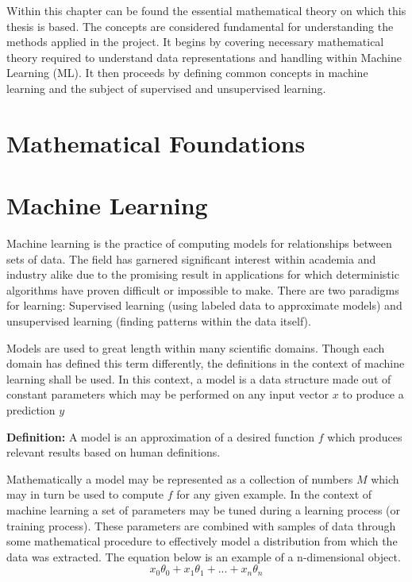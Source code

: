 Within this chapter can be found the essential mathematical theory on which this thesis is based. The concepts are considered fundamental for understanding the methods applied in the project. It begins by 
covering necessary mathematical theory required to understand data representations and handling within Machine Learning (ML). It then proceeds by defining common concepts in machine learning and the subject of supervised and unsupervised learning.


\section{Mathematical Foundations}

\section{Machine Learning}

Machine learning is the practice of computing models for relationships between sets of data. The field has garnered significant interest within academia and industry alike due to the promising result in applications for which deterministic algorithms have proven difficult or impossible to make. There are two paradigms for learning: Supervised learning (using labeled data to approximate models) and unsupervised learning (finding patterns within the data itself). 

Models are used to great length within many scientific domains. Though each domain has defined this term differently, the definitions in the context of machine learning shall be used. In this context, a model is a data structure made out of constant parameters which may be performed on any input vector $x$ to produce a prediction $y$

\vspace{5mm}

\textbf{Definition: } A model is an approximation of a desired function $f$ which produces relevant results based on human definitions.  

\vspace{5mm}

Mathematically a model may be represented as a collection of numbers $M$ which may in turn be used to compute $f$ for any given example.
In the context of machine learning a set of parameters may be tuned during a learning process (or training process). These parameters are combined with samples of data through some mathematical procedure to effectively model a distribution from which the data was extracted. The equation below is an example of a n-dimensional object.
$$x_0\theta_0 + x_1\theta_1 + ... + x_n\theta_n$$

